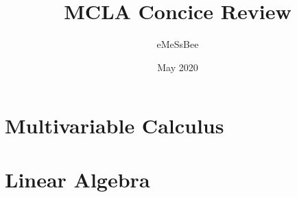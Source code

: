 \documentclass{report}
\begin{document}
\title{\Large{\textbf{MCLA Concice Review}}}
\author{eMeSsBee}
\date{May 2020}

\maketitle
\tableofcontents

\clearpage
{}

\part{Multivariable Calculus}









% 

\part{Linear Algebra}








% 
\end{document}
